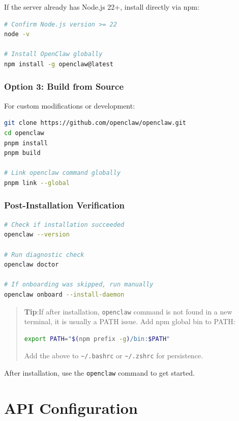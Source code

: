 If the server already has Node.js 22+, install directly via npm:

\begin{lstlisting}[language=bash]
# Confirm Node.js version >= 22
node -v

# Install OpenClaw globally
npm install -g openclaw@latest
\end{lstlisting}

\subsubsection{Option 3: Build from Source}

For custom modifications or development:

\begin{lstlisting}[language=bash]
git clone https://github.com/openclaw/openclaw.git
cd openclaw
pnpm install
pnpm build

# Link openclaw command globally
pnpm link --global
\end{lstlisting}

\subsubsection{Post-Installation Verification}

\begin{lstlisting}[language=bash]
# Check if installation succeeded
openclaw --version

# Run diagnostic check
openclaw doctor

# If onboarding was skipped, run manually
openclaw onboard --install-daemon
\end{lstlisting}

\begin{quote}
\textbf{Tip}:If after installation, \texttt{openclaw} command is not found in a new terminal, it is usually a PATH issue. Add npm global bin to PATH:
\begin{lstlisting}[language=bash]
export PATH="$(npm prefix -g)/bin:$PATH"
\end{lstlisting}
Add the above to \texttt{\textasciitilde{}/.bashrc} or \texttt{\textasciitilde{}/.zshrc}  for persistence.
\end{quote}

After installation, use the \texttt{openclaw} command to get started.

\hrulefill

\section{API Configuration}


